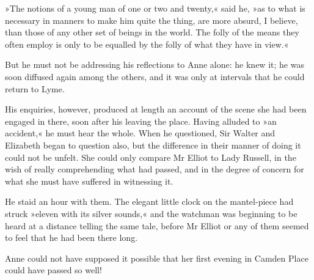 »The notions of a young man of one or two and twenty,« said he, »as to what is necessary in manners to make him quite the thing, are more absurd, I believe, than those of any other set of beings in the world. The folly of the means they often employ is only to be equalled by the folly of what they have in view.«

But he must not be addressing his reflections to Anne alone: he knew it; he was soon diffused again among the others, and it was only at intervals that he could return to Lyme.

His enquiries, however, produced at length an account of the scene she had been engaged in there, soon after his leaving the place. Having alluded to »an accident,« he must hear the whole. When he questioned, Sir Walter and Elizabeth began to question also, but the difference in their manner of doing it could not be unfelt. She could only compare Mr Elliot to Lady Russell, in the wish of really comprehending what had passed, and in the degree of concern for what she must have suffered in witnessing it.

He staid an hour with them. The elegant little clock on the mantel-piece had struck »eleven with its silver sounds,« and the watchman was beginning to be heard at a distance telling the same tale, before Mr Elliot or any of them seemed to feel that he had been there long.

Anne could not have supposed it possible that her first evening in Camden Place could have passed so well!